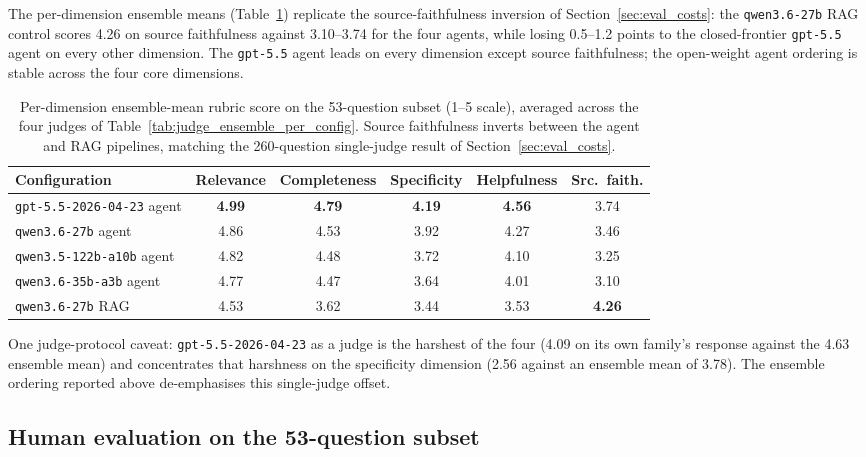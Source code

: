 The per-dimension ensemble means
(Table~\ref{tab:judge_ensemble_per_dim}) replicate the
source-faithfulness inversion of
Section~\ref{sec:eval_costs}: the \texttt{qwen3.6-27b} RAG
control scores 4.26 on source faithfulness against 3.10--3.74
for the four agents, while losing 0.5--1.2 points to the
closed-frontier \texttt{gpt-5.5} agent on every other dimension. The
\texttt{gpt-5.5} agent leads on every dimension except source
faithfulness; the open-weight agent ordering is stable across
the four core dimensions.

\begin{table}[htbp]
\centering
\caption{Per-dimension ensemble-mean rubric score on the
53-question subset (1--5 scale), averaged across the four
judges of Table~\ref{tab:judge_ensemble_per_config}. Source
faithfulness inverts between the agent and RAG pipelines,
matching the 260-question single-judge result of
Section~\ref{sec:eval_costs}.}
\label{tab:judge_ensemble_per_dim}
\begin{tabular}{lccccc}
\toprule
\textbf{Configuration} & \textbf{Relevance} & \textbf{Completeness} & \textbf{Specificity} & \textbf{Helpfulness} & \textbf{Src.\ faith.} \\
\midrule
\texttt{gpt-5.5-2026-04-23} agent & \textbf{4.99} & \textbf{4.79} & \textbf{4.19} & \textbf{4.56} & 3.74 \\
\texttt{qwen3.6-27b} agent        & 4.86 & 4.53 & 3.92 & 4.27 & 3.46 \\
\texttt{qwen3.5-122b-a10b} agent  & 4.82 & 4.48 & 3.72 & 4.10 & 3.25 \\
\texttt{qwen3.6-35b-a3b} agent    & 4.77 & 4.47 & 3.64 & 4.01 & 3.10 \\
\texttt{qwen3.6-27b} RAG          & 4.53 & 3.62 & 3.44 & 3.53 & \textbf{4.26} \\
\bottomrule
\end{tabular}
\end{table}

One judge-protocol caveat: \texttt{gpt-5.5-2026-04-23} as a
judge is the harshest of the four (4.09 on its own family's
response against the 4.63 ensemble mean) and concentrates that
harshness on the specificity dimension (2.56 against an ensemble
mean of 3.78). The ensemble ordering reported above
de-emphasises this single-judge offset.

\subsection{Human evaluation on the 53-question subset}
\label{sec:eval_human_53}

